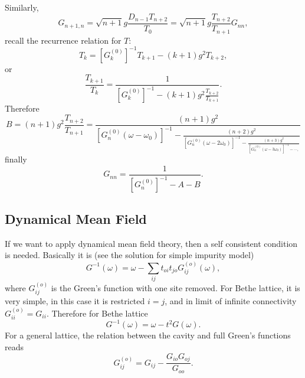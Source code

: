 \documentclass{book}
\numberwithin{equation}{section}
\begin{document}
Similarly, 
\begin{equation}
  G_{n+1,n}=\sqrt{n+1}g\frac{D_{n-1}T_{n+2}}{T_0}
  =\sqrt{n+1}g\frac{T_{n+2}}{T_{n+1}}G_{nn},
\end{equation}
recall the recurrence relation for $T$:
\begin{equation}
  T_k=[G^{(0)}_k]^{-1}T_{k+1}-(k+1)g^2T_{k+2},
\end{equation}
or
\begin{equation}
  \frac{T_{k+1}}{T_k}=\frac{1}{\displaystyle
    [G^{(0)}_k]^{-1}-(k+1)g^2\frac{T_{k+2}}{T_{k+1}}}.
\end{equation}
Therefore 
\begin{equation}
  B=(n+1)g^2\frac{T_{n+2}}{T_{n+1}}=
  \frac{(n+1)g^2}{\displaystyle
    [G^{(0)}_n(\omega-\omega_0)]^{-1}-\frac{(n+2)g^2}{\displaystyle
      [G^{(0)}_n(\omega-2\omega_0)]^{-1}-\frac{(n+3)g^2}{\displaystyle
        [G^{(0)}_n(\omega-3\omega_0)]^{-1}-\cdots,}}}
\end{equation}
finally 
\begin{equation}
  G_{nn}=\frac{1}{[G^{(0)}_n]^{-1}-A-B}.
\end{equation}

\subsection{Dynamical Mean Field}
If we want to apply dynamical mean field theory, then a self
consistent condition is needed. Basically it is (see the solution for
simple impurity model)
\begin{equation}
  G^{-1}(\omega)=\omega-\sum_{ij}t_{oi}t_{jo}G^{(o)}_{ij}(\omega),
  \label{DMFT-self-consistent}
\end{equation}
where $G^{(o)}_{ij}$ is the Green's function with one site removed.
For Bethe lattice, it is very simple, in this case it is restricted
$i=j$, and in limit of infinite connectivity
$G^{(o)}_{ii}=G_{ii}$. Therefore for Bethe lattice
\begin{equation}
  G^{-1}(\omega)=\omega-t^2G(\omega).
\end{equation}
For a general lattice, the relation between the cavity and full
Green's functions reads
\begin{equation}
  G^{(o)}_{ij}=G_{ij}-\frac{G_{io}G_{oj}}{G_{oo}}.
\end{equation}
\end{document}
